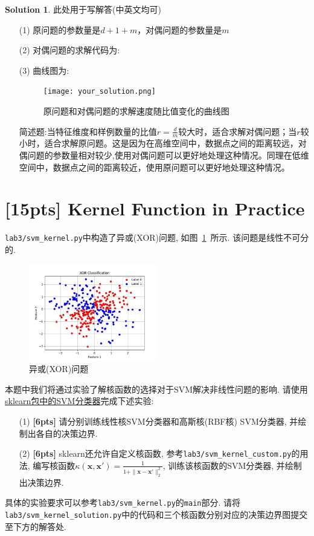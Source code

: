 \documentclass[a4paper,UTF8]{article}
\numberwithin{equation}{section}
\theoremstyle{definition}
\newtheorem*{solution}{Solution}
\newcommand{\vct}[1]{\boldsymbol{#1}} %
\newcommand{\vx}{\vct{x}}
\begin{document}
\begin{solution}
    此处用于写解答(中英文均可)
    \begin{enumerate}
        \item[(1)] 原问题的参数量是$d+1+m$，对偶问题的参数量是$m$
        \item[(2)] 对偶问题的求解代码为:
        
        \item[(3)] 曲线图为:
         \begin{figure}[h]
             \centering
            \texttt{[image: your\_solution.png]}
             \caption{原问题和对偶问题的求解速度随比值变化的曲线图}
         \end{figure}
        
        简述题:当特征维度和样例数量的比值$r = \frac{d}{m}$较大时，适合求解对偶问题；当$r$较小时，适合求解原问题。这是因为在高维空间中，数据点之间的距离较远，对偶问题的参数量相对较少,使用对偶问题可以更好地处理这种情况。同理在低维空间中，数据点之间的距离较近，使用原问题可以更好地处理这种情况。
    \end{enumerate}
\end{solution}

\newpage

\section{[15pts] Kernel Function in Practice}

\texttt{lab3/svm\_kernel.py}中构造了异或(XOR)问题, 如图~\ref{xor}~所示. 该问题是线性不可分的.
\begin{figure}[h]
    \centering
    \includegraphics[width=0.5\textwidth]{lab3/XOR_data.jpg}
    \caption{异或(XOR)问题}
    \label{xor}
\end{figure}

本题中我们将通过实验了解核函数的选择对于SVM解决非线性问题的影响. 请使用\href{https://scikit-learn.org/stable/modules/generated/sklearn.svm.SVC.html}{ sklearn包中的SVM分类器}完成下述实验: 
\begin{enumerate}
    \item[(1)] \textbf{[6pts]} 请分别训练线性核SVM分类器和高斯核(RBF核) SVM分类器, 并绘制出各自的决策边界.
    \item[(2)] \textbf{[6pts]} sklearn还允许自定义核函数, 参考\texttt{lab3/svm\_kernel\_custom.py}的用法, 编写核函数$\kappa(\vx, \vx') = \frac{1}{1+\|\vx-\vx'\|_2^{2}}$, 训练该核函数的SVM分类器, 并绘制出决策边界. 
\end{enumerate} 
具体的实验要求可以参考\texttt{lab3/svm\_kernel.py}的\texttt{main}部分. 请将\texttt{lab3/svm\_kernel\_solution.py}中的代码和三个核函数分别对应的决策边界图提交至下方的解答处. 
\vspace{5pt}
\end{document}
